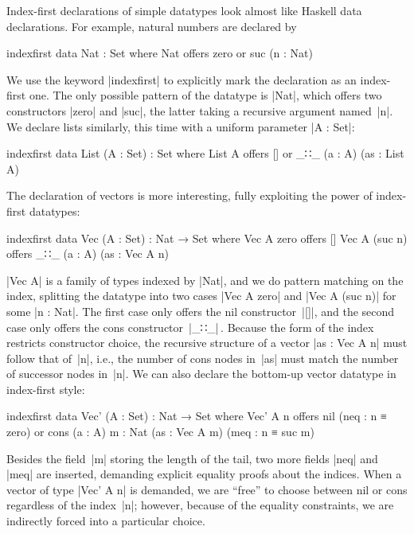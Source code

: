 Index-first declarations of simple datatypes look almost like Haskell data declarations.
For example, natural numbers are declared by
\begin{code}
indexfirst data Nat : Set where
  Nat  offers  zero
       or      suc (n : Nat)
\end{code}
We use the keyword |indexfirst| to explicitly mark the declaration as an index-first one.
The only possible pattern of the datatype is |Nat|, which offers two constructors |zero| and |suc|, the latter taking a recursive argument named~|n|.
We declare lists similarly, this time with a uniform parameter |A : Set|:
\begin{code}
indexfirst data List (A : Set) : Set where
  List A  offers  []
          or      _∷_ (a : A) (as : List A)
\end{code}
The declaration of vectors is more interesting, fully exploiting the power of index-first datatypes:
\begin{code}
indexfirst data Vec (A : Set) : Nat → Set where
  Vec A zero     offers  []
  Vec A (suc n)  offers  _∷_ (a : A) (as : Vec A n)
\end{code}
|Vec A| is a family of types indexed by |Nat|, and we do pattern matching on the index, splitting the datatype into two cases |Vec A zero| and |Vec A (suc n)| for some |n : Nat|.
The first case only offers the nil constructor~|[]|, and the second case only offers the cons constructor~|_∷_|\,.
Because the form of the index restricts constructor choice, the recursive structure of a vector |as : Vec A n| must follow that of~|n|, i.e., the number of cons nodes in~|as| must match the number of successor nodes in~|n|.
We can also declare the bottom-up vector datatype in index-first style:
\begin{code}
indexfirst data Vec' (A : Set) : Nat → Set where
  Vec' A n  offers  nil (neq : n ≡ zero)
            or      cons  (a : A) {m : Nat}
                          (as : Vec A m) (meq : n ≡ suc m)
\end{code}
Besides the field~|m| storing the length of the tail, two more fields |neq| and |meq| are inserted, demanding explicit equality proofs about the indices.
When a vector of type |Vec' A n| is demanded, we are ``free'' to choose between nil or cons regardless of the index~|n|; however, because of the equality constraints, we are indirectly forced into a particular choice.


